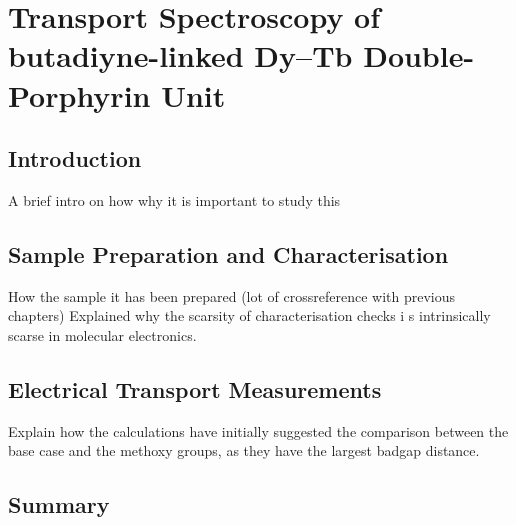 \chapter{\label{ch:porphyrin} Transport Spectroscopy of butadiyne-linked Dy--Tb Double-Porphyrin Unit}

\minitoc

\section{Introduction}\label{prp:sec:intro}

A brief intro on how why it is important to study this


\section{Sample Preparation and Characterisation}\label{prp:sec:chara}

How the sample it has been prepared (lot of crossreference with previous chapters)
Explained why the scarsity of characterisation checks i
s intrinsically scarse in molecular electronics.


\section{Electrical Transport Measurements}\label{prp:sec:measure}

Explain how the calculations have initially suggested the comparison between the base case and the methoxy groups,
as they have the largest badgap distance. 

\section{Summary}\label{prp:sec:summary}